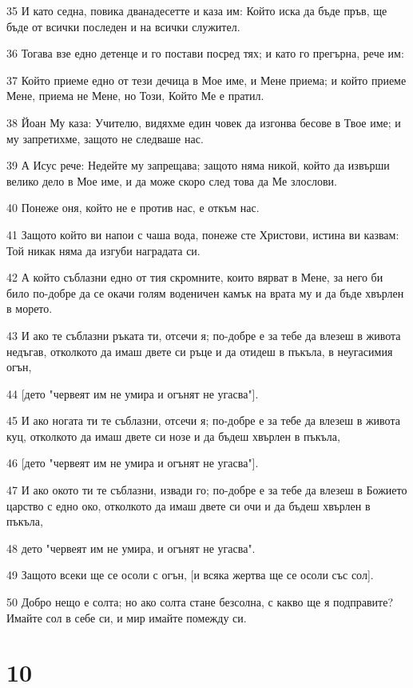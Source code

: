 \par 35 И като седна, повика дванадесетте и каза им: Който иска да бъде пръв, ще бъде от всички последен и на всички служител.
\par 36 Тогава взе едно детенце и го постави посред тях; и като го прегърна, рече им:
\par 37 Който приеме едно от тези дечица в Мое име, и Мене приема; и който приеме Мене, приема не Мене, но Този, Който Ме е пратил.
\par 38 Йоан Му каза: Учителю, видяхме един човек да изгонва бесове в Твое име; и му запретихме, защото не следваше нас.
\par 39 А Исус рече: Недейте му запрещава; защото няма никой, който да извърши велико дело в Мое име, и да може скоро след това да Ме злослови.
\par 40 Понеже оня, който не е против нас, е откъм нас.
\par 41 Защото който ви напои с чаша вода, понеже сте Христови, истина ви казвам: Той никак няма да изгуби наградата си.
\par 42 А който съблазни едно от тия скромните, които вярват в Мене, за него би било по-добре да се окачи голям воденичен камък на врата му и да бъде хвърлен в морето.
\par 43 И ако те съблазни ръката ти, отсечи я; по-добре е за тебе да влезеш в живота недъгав, отколкото да имаш двете си ръце и да отидеш в пъкъла, в неугасимия огън,
\par 44 [дето "червеят им не умира и огънят не угасва"].
\par 45 И ако ногата ти те съблазни, отсечи я; по-добре е за тебе да влезеш в живота куц, отколкото да имаш двете си нозе и да бъдеш хвърлен в пъкъла,
\par 46 [дето "червеят им не умира и огънят не угасва"].
\par 47 И ако окото ти те съблазни, извади го; по-добре е за тебе да влезеш в Божието царство с едно око, отколкото да имаш двете си очи и да бъдеш хвърлен в пъкъла,
\par 48 дето "червеят им не умира, и огънят не угасва".
\par 49 Защото всеки ще се осоли с огън, [и всяка жертва ще се осоли със сол].
\par 50 Добро нещо е солта; но ако солта стане безсолна, с какво ще я подправите? Имайте сол в себе си, и мир имайте помежду си.

\chapter{10}

